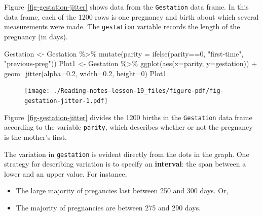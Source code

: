 \documentclass[
  letterpaper,
  DIV=11,
  numbers=noendperiod,
  oneside]{scrreprt}
\newenvironment{Shaded}{\begin{snugshade}}{\end{snugshade}}
\newcommand{\AttributeTok}[1]{\textcolor[rgb]{0.40,0.45,0.13}{#1}}
\newcommand{\DecValTok}[1]{\textcolor[rgb]{0.68,0.00,0.00}{#1}}
\newcommand{\FloatTok}[1]{\textcolor[rgb]{0.68,0.00,0.00}{#1}}
\newcommand{\FunctionTok}[1]{\textcolor[rgb]{0.28,0.35,0.67}{#1}}
\newcommand{\NormalTok}[1]{\textcolor[rgb]{0.00,0.23,0.31}{#1}}
\newcommand{\OtherTok}[1]{\textcolor[rgb]{0.00,0.23,0.31}{#1}}
\newcommand{\SpecialCharTok}[1]{\textcolor[rgb]{0.37,0.37,0.37}{#1}}
\newcommand{\StringTok}[1]{\textcolor[rgb]{0.13,0.47,0.30}{#1}}
\providecommand{\tightlist}{%
  \setlength{\itemsep}{0pt}\setlength{\parskip}{0pt}}\usepackage{longtable,booktabs,array}
\begin{document}
Figure~\ref{fig-gestation-jitter} shows data from the \texttt{Gestation}
data frame. In this data frame, each of the 1200 rows is one pregnancy
and birth about which several measurements were made. The
\texttt{gestation} variable records the length of the pregnancy (in
days).

\begin{Shaded}
\begin{Highlighting}[]
\NormalTok{Gestation }\OtherTok{\textless{}{-}}\NormalTok{ Gestation }\SpecialCharTok{\%\textgreater{}\%} 
  \FunctionTok{mutate}\NormalTok{(}\AttributeTok{parity =} \FunctionTok{ifelse}\NormalTok{(parity}\SpecialCharTok{==}\DecValTok{0}\NormalTok{, }\StringTok{"first{-}time"}\NormalTok{, }\StringTok{"previous{-}preg"}\NormalTok{)) }
\NormalTok{Plot1 }\OtherTok{\textless{}{-}}\NormalTok{ Gestation }\SpecialCharTok{\%\textgreater{}\%}
  \FunctionTok{ggplot}\NormalTok{(}\FunctionTok{aes}\NormalTok{(}\AttributeTok{x=}\NormalTok{parity, }\AttributeTok{y=}\NormalTok{gestation)) }\SpecialCharTok{+} 
  \FunctionTok{geom\_jitter}\NormalTok{(}\AttributeTok{alpha=}\FloatTok{0.2}\NormalTok{, }\AttributeTok{width=}\FloatTok{0.2}\NormalTok{, }\AttributeTok{height=}\DecValTok{0}\NormalTok{) }
\NormalTok{Plot1}
\end{Highlighting}
\end{Shaded}

\begin{figure}[H]


{\centering \texttt{[image: ./Reading-notes-lesson-19\_files/figure-pdf/fig-gestation-jitter-1.pdf]}

}

\end{figure}

Figure~\ref{fig-gestation-jitter} divides the 1200 births in the
\texttt{Gestation} data frame according to the variable \texttt{parity},
which describes whether or not the pregnancy is the mother's first.

The variation in \texttt{gestation} is evident directly from the dots in
the graph. One strategy for describing variation is to specify an
\textbf{interval}: the span between a lower and an upper value. For
instance,

\begin{itemize}
\tightlist
\item
  The large majority of pregancies last between 250 and 300 days. Or,
\item
  The majority of pregnancies are between 275 and 290 days.
\end{itemize}
\end{document}
